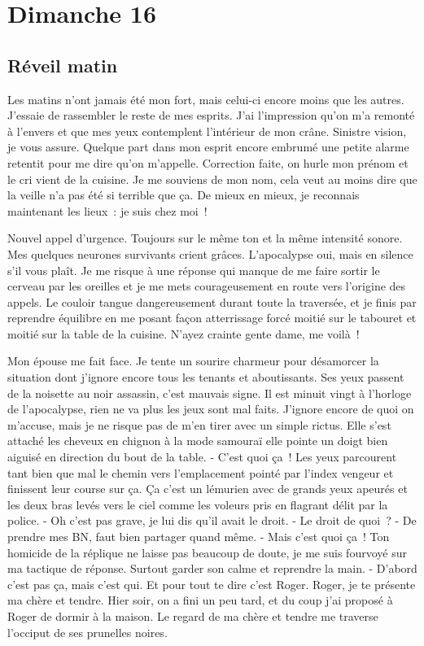 ﻿\section*{Dimanche 16}
\subsection*{Réveil matin}
Les matins n’ont jamais été mon fort, mais celui-ci encore moins que les autres. J’essaie de rassembler le reste de mes esprits. J’ai l’impression qu’on m’a remonté à l’envers et que mes yeux contemplent l’intérieur de mon crâne. Sinistre vision, je vous assure. 
Quelque part dans mon esprit encore embrumé une petite alarme retentit pour me dire qu’on m’appelle. Correction faite, on hurle mon prénom et le cri vient de la cuisine. Je me souviens de mon nom, cela veut au moins dire que la veille n’a pas été si terrible que ça. De mieux en mieux, je reconnais maintenant les lieux : je suis chez moi ! 

Nouvel appel d’urgence. Toujours sur le même ton et la même intensité sonore. Mes quelques neurones survivants crient grâces. L’apocalypse oui, mais en silence s’il vous plaît. Je me risque à une réponse qui manque de me faire sortir le cerveau par les oreilles et je me mets courageusement en route vers l’origine des appels. Le couloir tangue dangereusement durant toute la traversée, et je finis par reprendre équilibre en me posant façon atterrissage forcé moitié sur le tabouret et moitié sur la table de la cuisine. N’ayez crainte gente dame, me voilà !

Mon épouse me fait face. Je tente un sourire charmeur pour désamorcer la situation dont j’ignore encore tous les tenants et aboutissants. Ses yeux passent de la noisette au noir assassin, c’est mauvais signe. Il est minuit vingt à l’horloge de l’apocalypse, rien ne va plus les jeux sont mal faits. J’ignore encore de quoi on m’accuse, mais je ne risque pas de m’en tirer avec un simple rictus.
Elle s’est attaché les cheveux en chignon à la mode samouraï elle pointe un doigt bien aiguisé en direction du bout de la table. 
- C’est quoi ça !
Les yeux parcourent tant bien que mal le chemin vers l’emplacement pointé par l’index vengeur et finissent leur course sur ça. Ça c’est un lémurien avec de grands yeux apeurés et les deux bras levés vers le ciel comme les voleurs pris en flagrant délit par la police.
- Oh c’est pas grave, je lui dis qu’il avait le droit.
- Le droit de quoi ?
- De prendre mes BN, faut bien partager quand même.
- Mais c’est quoi ça !
Ton homicide de la réplique ne laisse pas beaucoup de doute, je me suis fourvoyé sur ma tactique de réponse. Surtout garder son calme et reprendre la main.
- D’abord c’est pas ça, mais c’est qui. Et pour tout te dire c’est Roger. Roger, je te présente ma chère et tendre. Hier soir, on a fini un peu tard, et du coup j’ai proposé à Roger de dormir à la maison.
Le regard de ma chère et tendre me traverse l’occiput de ses prunelles noires.


